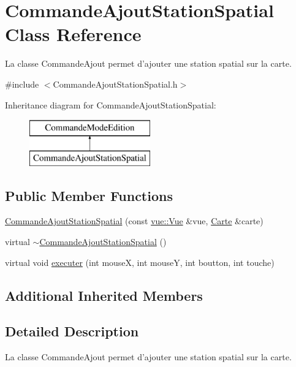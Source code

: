 \hypertarget{class_commande_ajout_station_spatial}{\section{Commande\-Ajout\-Station\-Spatial Class Reference}
\label{class_commande_ajout_station_spatial}
}


La classe Commande\-Ajout permet d'ajouter une station spatial sur la carte.  




{\ttfamily \#include $<$Commande\-Ajout\-Station\-Spatial.\-h$>$}

Inheritance diagram for Commande\-Ajout\-Station\-Spatial\-:\begin{figure}[H]
\begin{center}
\leavevmode
\includegraphics[height=2.000000cm]{class_commande_ajout_station_spatial}
\end{center}
\end{figure}
\subsection*{Public Member Functions}
\begin{DoxyCompactItemize}
\item 
\hyperlink{class_commande_ajout_station_spatial_ac827fa45fba577affd3455adede0c426}{Commande\-Ajout\-Station\-Spatial} (const \hyperlink{classvue_1_1_vue}{vue\-::\-Vue} \&vue, \hyperlink{class_carte}{Carte} \&carte)
\item 
virtual \hyperlink{class_commande_ajout_station_spatial_a41b6a3345606a722dcbec687ab234d9e}{$\sim$\-Commande\-Ajout\-Station\-Spatial} ()
\item 
virtual void \hyperlink{class_commande_ajout_station_spatial_a92ca290ca6ca127e618e3463bf3fe75b}{executer} (int mouse\-X, int mouse\-Y, int boutton, int touche)
\end{DoxyCompactItemize}
\subsection*{Additional Inherited Members}


\subsection{Detailed Description}
La classe Commande\-Ajout permet d'ajouter une station spatial sur la carte. 

